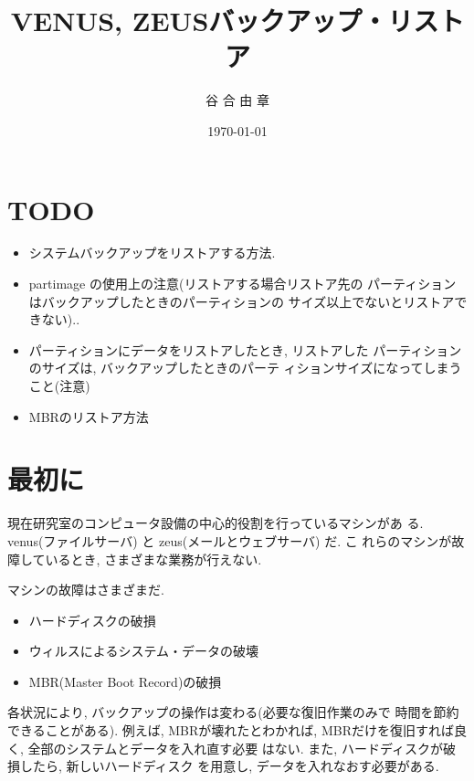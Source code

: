 \documentclass{jarticle}
\begin{document}
\title{VENUS, ZEUSバックアップ・リストア}
\date{\today}
\author{谷 合 由 章}
\topmargin -15mm        \textheight 250mm       \textwidth 180mm
\oddsidemargin -10mm    \evensidemargin -10mm
\maketitle

\begin{quote}
\begin{screen}
\tableofcontents
\end{screen}
\end{quote}

\section{TODO}

\begin{itemize}
\item システムバックアップをリストアする方法.
\item partimage の使用上の注意(リストアする場合リストア先の
      パーティションはバックアップしたときのパーティションの
      サイズ以上でないとリストアできない)..
\item パーティションにデータをリストアしたとき, リストアした
      パーティションのサイズは, バックアップしたときのパーテ
      ィションサイズになってしまうこと(注意)
\item MBRのリストア方法
\end{itemize}

\section{最初に}
現在研究室のコンピュータ設備の中心的役割を行っているマシンがあ
る. venus(ファイルサーバ) と zeus(メールとウェブサーバ) だ. こ
れらのマシンが故障しているとき, さまざまな業務が行えない.

マシンの故障はさまざまだ.

\begin{itemize}
\item ハードディスクの破損
\item ウィルスによるシステム・データの破壊
\item MBR(Master Boot Record)の破損
\end{itemize}
各状況により, バックアップの操作は変わる(必要な復旧作業のみで
時間を節約できることがある). 例えば, MBRが壊れたとわかれば,
MBRだけを復旧すれば良く, 全部のシステムとデータを入れ直す必要
はない. また, ハードディスクが破損したら, 新しいハードディスク
を用意し, データを入れなおす必要がある.
\end{document}
